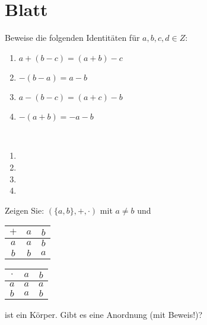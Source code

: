 \section{Blatt}


\begin{aufg}[6 Punkte]
Beweise die folgenden Identit\"aten f\"ur $a,b,c,d \in Z$:
\begin{enumerate}[label=$\mathrm{(\roman*)}$, ref=$\mathrm{\roman*}$]
\item $a+(b-c)=(a+b)-c$
\item $-(b-a)=a-b$
\item $a-(b-c)=(a+c)-b$
\item $-(a+b)=-a-b$
\end{enumerate}
\end{aufg}

\bigskip

\begin{lsg}\mbox{ }
\begin{enumerate}[label=$\mathrm{(\roman*)}$, ref=$\mathrm{\roman*}$]
\item 
%
\item 
%
\item 
%
\item 
\end{enumerate}
\end{lsg}

\bigskip

\begin{aufg}[6 Punkte]
Zeigen Sie: $\left( \{a,b\}, + , \cdot \right)$ mit $a\not=b$ und 
\begin{center}
\begin{tabular}{c|cc}
 $+$ & $a$ & $b$
 \\ \hline
 $a$ & $a$ & $b$
 \\
 $b$ & $b$ & $a$
\end{tabular}
\qquad
\begin{tabular}{c|cc}
 $\cdot$ & $a$ & $b$
 \\ \hline
 $a$ & $a$ & $a$
 \\
 $b$ & $a$ & $b$
\end{tabular}
\end{center}
ist ein K\"orper. Gibt es eine Anordnung (mit Beweis!)?
\end{aufg}
 
\bigskip

\begin{lsg}
\end{lsg}

\bigskip


